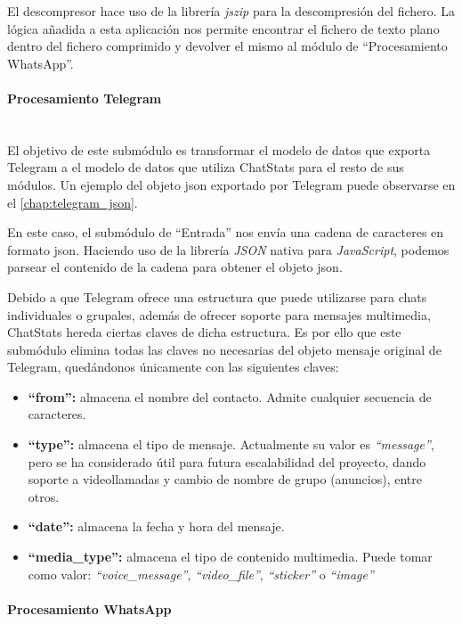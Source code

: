 El descompresor hace uso de la librería \textit{jszip} para la descompresión del fichero. La lógica añadida a esta aplicación nos permite encontrar el fichero de texto plano dentro del fichero comprimido y devolver el mismo al módulo de ``Procesamiento WhatsApp''.


\paragraph{Procesamiento Telegram}\mbox{}\\

El objetivo de este submódulo es transformar el modelo de datos que exporta Telegram a el modelo de datos que utiliza ChatStats para el resto de sus módulos. Un ejemplo del objeto \acrshort{json} exportado por Telegram puede observarse en el \autoref{chap:telegram_json}.

En este caso, el submódulo de ``Entrada'' nos envía una cadena de caracteres en formato \acrshort{json}. Haciendo uso de la librería \textit{JSON} nativa para \textit{JavaScript}, podemos parsear el contenido de la cadena para obtener el objeto \acrshort{json}.

Debido a que Telegram ofrece una estructura que puede utilizarse para chats individuales o grupales, además de ofrecer soporte para mensajes multimedia, ChatStats hereda ciertas claves de dicha estructura. Es por ello que este submódulo elimina todas las claves no necesarias del objeto mensaje original de Telegram, quedándonos únicamente con las siguientes claves:

\begin{itemize}
	\item \textbf{``from'':} almacena el nombre del contacto. Admite cualquier secuencia de caracteres.
	\item \textbf{``type'':} almacena el tipo de mensaje. Actualmente su valor es \textit{``message''}, pero se ha considerado útil para futura escalabilidad del proyecto, dando soporte a videollamadas y cambio de nombre de grupo (anuncios), entre otros.
	\item \textbf{``date'':} almacena la fecha y hora del mensaje.
	\item \textbf{``media\_type'':} almacena el tipo de contenido multimedia. Puede tomar como valor: \textit{``voice\_message''}, \textit{``video\_file''}, \textit{``sticker''} o \textit{``image''}
\end{itemize}

\paragraph{Procesamiento WhatsApp}\mbox{}\\

